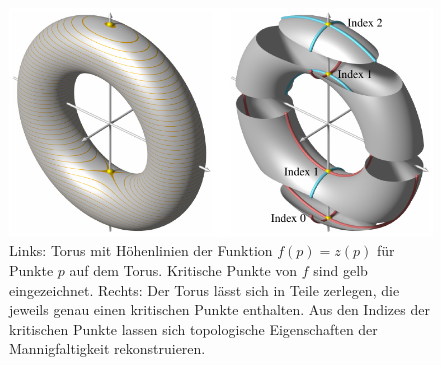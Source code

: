 %
%
%
\begin{figure}
\centering
\includegraphics{chapters/120-topologie/images/morse.pdf}
\caption{Links: Torus mit Höhenlinien der Funktion $f(p) = z(p)$ für Punkte
$p$ auf dem Torus.
%
Kritische Punkte von $f$ sind gelb eingezeichnet.
%
Rechts: Der Torus lässt sich in Teile zerlegen, die jeweils genau
einen kritischen Punkte enthalten. Aus den Indizes der kritischen Punkte
%
lassen sich topologische Eigenschaften der Mannigfaltigkeit rekonstruieren.
\label{buch:topologie:fig:morse}}
\end{figure}
